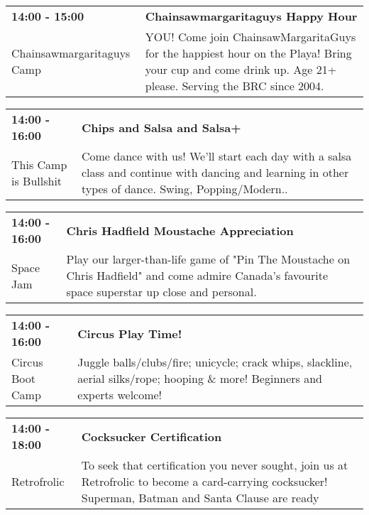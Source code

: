 \begin{tabular}{ p{1in} p{2.2in} }
    \textbf{14:00 - 15:00} & \textbf{Chainsawmargaritaguys Happy Hour} \\
    Chainsawmargaritaguys Camp \newline  & YOU! Come join ChainsawMargaritaGuys for the happiest hour on the Playa! Bring your cup and come drink up. Age 21+ please. Serving the BRC since 2004. \\
    \hline 
\end{tabular}
    
\begin{tabular}{ p{1in} p{2.2in} }
    \textbf{14:00 - 16:00} & \textbf{Chips and Salsa and Salsa+} \\
    This Camp is Bullshit \newline  & Come dance with us!  We'll start each day with a salsa class and continue with dancing and learning in other types of dance.  Swing, Popping/Modern.. \\
    \hline 
\end{tabular}
    
\begin{tabular}{ p{1in} p{2.2in} }
    \textbf{14:00 - 16:00} & \textbf{Chris Hadfield Moustache Appreciation} \\
    Space Jam \newline  & Play our larger-than-life game of "Pin The Moustache on Chris Hadfield" and come admire Canada's favourite space superstar up close and personal. \\
    \hline 
\end{tabular}
    
\begin{tabular}{ p{1in} p{2.2in} }
    \textbf{14:00 - 16:00} & \textbf{Circus Play Time!} \\
    Circus Boot Camp \newline  & Juggle balls/clubs/fire; unicycle; crack whips, slackline, aerial silks/rope; hooping \& more! Beginners and experts welcome! \\
    \hline 
\end{tabular}
    
\begin{tabular}{ p{1in} p{2.2in} }
    \textbf{14:00 - 18:00} & \textbf{Cocksucker Certification} \\
    Retrofrolic \newline  & To seek that certification you never sought, join us at Retrofrolic to become a card-carrying cocksucker!  Superman, Batman and Santa Clause are ready \\
    \hline 
\end{tabular}
    
